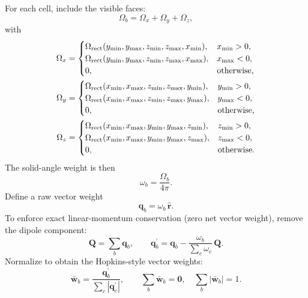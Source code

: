 \documentclass[11pt]{article}
\begin{document}
For each cell, include the visible faces:
\begin{equation}
\Omega_{b} =
\Omega_{x} + \Omega_{y} + \Omega_{z},
\end{equation}
with
\begin{align}
\Omega_{x} &=
\begin{cases}
\Omega_{\rm rect}(y_{\min},y_{\max},z_{\min},z_{\max},x_{\min}), & x_{\min} > 0, \\
\Omega_{\rm rect}(y_{\min},y_{\max},z_{\min},z_{\max},x_{\max}), & x_{\max} < 0, \\
0, & \text{otherwise,}
\end{cases} \\
\Omega_{y} &=
\begin{cases}
\Omega_{\rm rect}(x_{\min},x_{\max},z_{\min},z_{\max},y_{\min}), & y_{\min} > 0, \\
\Omega_{\rm rect}(x_{\min},x_{\max},z_{\min},z_{\max},y_{\max}), & y_{\max} < 0, \\
0, & \text{otherwise,}
\end{cases} \\
\Omega_{z} &=
\begin{cases}
\Omega_{\rm rect}(x_{\min},x_{\max},y_{\min},y_{\max},z_{\min}), & z_{\min} > 0, \\
\Omega_{\rm rect}(x_{\min},x_{\max},y_{\min},y_{\max},z_{\max}), & z_{\max} < 0, \\
0, & \text{otherwise.}
\end{cases}
\end{align}
The solid-angle weight is then
\begin{equation}
\omega_{b} = \frac{\Omega_{b}}{4\pi}.
\end{equation}
Define a raw vector weight
\begin{equation}
\mathbf q_{b} = \omega_{b}\,\hat{\mathbf r}.
\end{equation}
To enforce exact linear-momentum conservation (zero net vector weight), remove the
dipole component:
\begin{equation}
\mathbf Q = \sum_{b}\mathbf q_{b}, \qquad
\mathbf q^{\prime}_{b} = \mathbf q_{b} - \frac{\omega_{b}}{\sum_{c}\omega_{c}}\,\mathbf Q.
\end{equation}
Normalize to obtain the Hopkins-style vector weights:
\begin{equation}
\bar{\mathbf w}_{b} = \frac{\mathbf q^{\prime}_{b}}{\sum_{c}|\mathbf q^{\prime}_{c}|}, \qquad
\sum_{b}\bar{\mathbf w}_{b}=\mathbf 0,\quad \sum_{b}|\bar{\mathbf w}_{b}|=1.
\end{equation}
\end{document}
